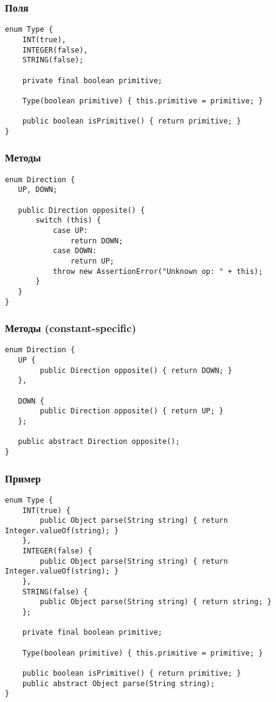 \documentclass[xetex,mathserif,serif]{beamer}
\begin{document}
	\begin{frame}[fragile]
		\frametitle{Поля}
		\begin{verbatim}
enum Type {
    INT(true), 
    INTEGER(false),
    STRING(false); 
 
    private final boolean primitive;
     
    Type(boolean primitive) { this.primitive = primitive; } 
 
    public boolean isPrimitive() { return primitive; } 
} 
		\end{verbatim}
	\end{frame}

	\begin{frame}[fragile]
		\frametitle{Методы}
		\begin{verbatim}
enum Direction { 
   UP, DOWN; 
 
   public Direction opposite() {
       switch (this) {
           case UP:
               return DOWN;
           case DOWN:
               return UP;
           throw new AssertionError("Unknown op: " + this);
       }
   } 
}
		\end{verbatim}
	\end{frame}

	\begin{frame}[fragile]
		\frametitle{Методы (constant-specific)}
		\begin{verbatim}
enum Direction { 
   UP { 
        public Direction opposite() { return DOWN; } 
   }, 
   
   DOWN { 
        public Direction opposite() { return UP; } 
   }; 
 
   public abstract Direction opposite(); 
}
		\end{verbatim}
	\end{frame}

	\begin{frame}[fragile]
		\frametitle{Пример}
		\begin{footnotesize}
			\begin{verbatim}
enum Type {
    INT(true) {
        public Object parse(String string) { return Integer.valueOf(string); }  
    }, 
    INTEGER(false) {
        public Object parse(String string) { return Integer.valueOf(string); }  
    },
    STRING(false) {
        public Object parse(String string) { return string; }
    }; 
 
    private final boolean primitive;
     
    Type(boolean primitive) { this.primitive = primitive; } 
 
    public boolean isPrimitive() { return primitive; } 
    public abstract Object parse(String string); 
}
			\end{verbatim}
		\end{footnotesize}
	\end{frame}
\end{document}
